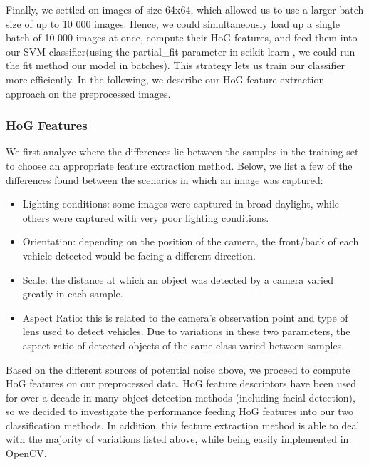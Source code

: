 \documentclass[12pt]{article}
\begin{document}
 Finally, we settled on images of size 64x64, which allowed us to use a larger batch size of up to 10 000 images. Hence, we could simultaneously load up a single batch of 10 000 images at once, compute their HoG features, and feed them into our SVM classifier(using the partial\_fit parameter in scikit-learn \cite{sklearn}, we could run the fit method our model in batches). This strategy lets us train our classifier more efficiently. In the following, we describe our HoG feature extraction approach on the preprocessed images.

\subsubsection{HoG Features}

We first analyze where the differences lie between the samples in the training set to choose an appropriate feature extraction method. Below, we list a few of the differences found between the scenarios in which an image was captured:

\begin{itemize}
    \item Lighting conditions: some images were captured in broad daylight, while others were captured with very poor lighting conditions.
    \item Orientation: depending on the position of the camera, the front/back of each vehicle detected would be facing a different direction.
    \item Scale: the distance at which an object was detected by a camera varied greatly in each sample.
    \item Aspect Ratio: this is related to the camera's observation point and type of lens used to detect vehicles. Due to variations in these two parameters, the aspect ratio of detected objects of the same class varied between samples.
\end{itemize}

Based on the different sources of potential noise above, we proceed to compute HoG features on our preprocessed data. HoG feature descriptors have been used for over a decade in many object detection methods (including facial detection), so we decided to investigate the performance feeding HoG features into our two classification methods. In addition, this feature extraction method is able to deal with the majority of variations listed above, while being easily implemented in OpenCV.
\end{document}
